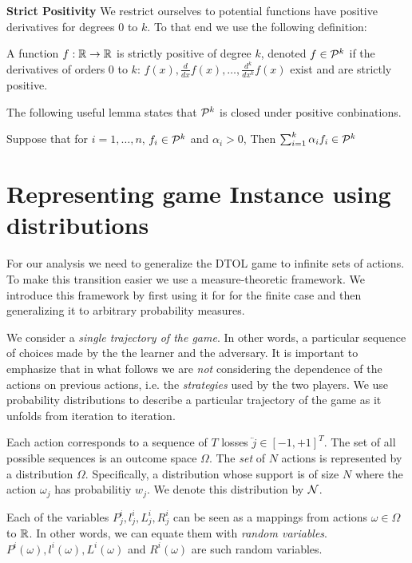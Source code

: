 \documentclass{article}[12pt]
\begin{document}
{\bf Strict Positivity} We restrict ourselves to potential functions have
positive derivatives for degrees $0$ to $k$.  To that end we use the
following definition:
\begin{definition}
A function $f:\mathbb{R} \to \mathbb{R}$ is strictly positive of degree $k$, 
denoted $f \in {\cal P}^{k}$ if the derivatives of orders 0 to $k$:  
$f(x), \frac{d}{dx}f(x), \ldots, \frac{d^k}{dx^k}f(x)$ exist and are strictly positive.
\end{definition}
The following useful lemma states that ${\cal P}^{k}$ is closed under positive conbinations.
\begin{lemma}  \label{lemma:SP-pos-comb}
  Suppose that for $i =1,\ldots,n$, $f_i \in {\cal P}^{k}$ and $\alpha_i>0$,
  Then $\sum_{i=1}^k \alpha_i f_i \in {\cal P}^{k}$
\end{lemma}


\section{Representing game Instance using distributions}
For our analysis we need to generalize the DTOL game to infinite sets
of actions.  To make this transition easier we use a measure-theoretic
framework. We introduce this framework by first using it for for the
finite case and then generalizing it to arbitrary probability
measures.

We consider a {\em single trajectory of the game}. In other words, a
particular sequence of choices made by the the learner and the
adversary. It is important to emphasize that in what follows we are
{\em not} considering the dependence of the actions on previous
actions, i.e. the {\em strategies} used by the two players. We use
probability distributions to describe a particular trajectory of the
game as it unfolds from iteration to iteration.

\newcommand{\Ndist}{{\cal N}}

Each action corresponds to a sequence of $T$ losses
$\lvec{j} \in [-1,+1]^T$. The set of all possible sequences is an
outcome space $\Omega$. The {\em set} of $N$ actions is represented
by a distribution $\Omega$. Specifically, a distribution whose
support is of size $N$ where the action $\omega_j$ has probabilitiy
$w_j$. We denote this distribution by $\Ndist$.

Each of the variables $P_j^i, l_j^i, L_j^i, R_j^i$ can be seen as a mappings
from actions $\omega \in \Omega$ to $\mathbb{R}$.  In other words, we can
equate them with {\em random variables}. 
$P^i(\omega), l^i(\omega), L^i(\omega)$ and $ R^i(\omega)$ are such random variables.
\end{document}
